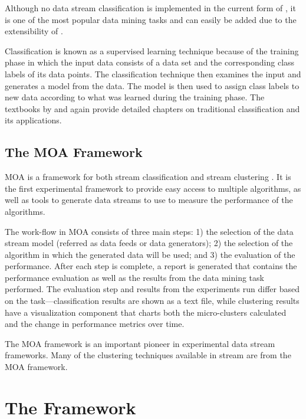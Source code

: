 \documentclass[nojss]{jss}
\begin{document}
Although no data stream classification is implemented in the current form of , it is one of the most popular data mining tasks and can easily be added due to the extensibility of . 


Classification is known as a supervised learning technique because of the training phase in which the input data consists of a data set and the corresponding class labels of its data points. The classification technique then examines the input and generates a model from the data. The model is then used to assign class labels to new data according to what was learned during the training phase. The textbooks by \cite{stream:Dunham:2002} and \cite{stream:Tan+Steinbach+Kumar:2006} again provide detailed chapters on traditional classification and its applications.

\subsection{The MOA Framework}
\label{sec:background:moa}

MOA is a framework for both stream classification and stream clustering \citep{stream:Bifet+Holmes+Kirkby+Pfahringer:2010}. It is the first experimental framework to provide easy access to multiple algorithms, as well as tools to generate data streams to use to measure the performance of the algorithms. 


The work-flow in MOA consists of three main steps: 1) the selection of the data stream model (referred as data feeds or data generators); 2) the selection of the algorithm in which the generated data will be used; and 3) the evaluation of the performance. After each step is complete, a report is generated that contains the performance evaluation as well as the results from the data mining task performed. The evaluation step and results from the experiments run differ based on the task---classification results are shown as a text file, while clustering results have a visualization component that charts both the micro-clusters calculated and the change in performance metrics over time.


The MOA framework is an important pioneer in experimental data stream frameworks. Many of the clustering techniques available in stream are from the MOA framework.

\section{The  Framework}
\label{sec:design}
\end{document}
